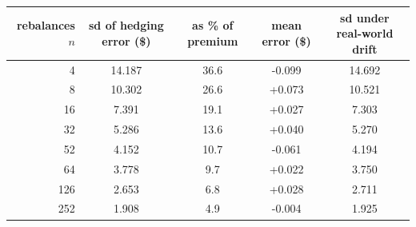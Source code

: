 \begin{tabular}{rcccc}
\toprule
rebalances $n$ & sd of hedging error (\$) & as \% of premium & mean error (\$) & sd under real-world drift \\
\midrule
4 & 14.187 & 36.6 & -0.099 & 14.692 \\
8 & 10.302 & 26.6 & +0.073 & 10.521 \\
16 & 7.391 & 19.1 & +0.027 & 7.303 \\
32 & 5.286 & 13.6 & +0.040 & 5.270 \\
52 & 4.152 & 10.7 & -0.061 & 4.194 \\
64 & 3.778 & 9.7 & +0.022 & 3.750 \\
126 & 2.653 & 6.8 & +0.028 & 2.711 \\
252 & 1.908 & 4.9 & -0.004 & 1.925 \\
\bottomrule
\end{tabular}
